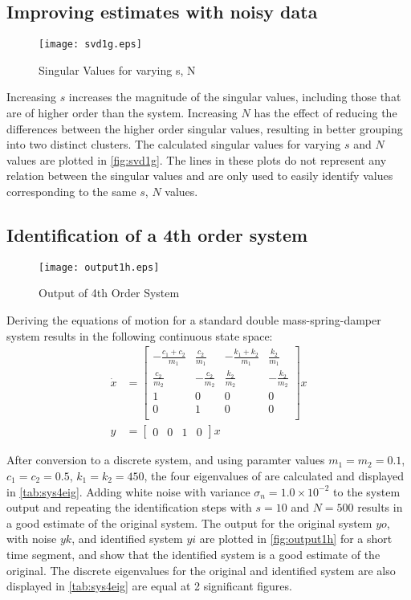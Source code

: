 \documentclass[11pt,a4paper]{article}
\begin{document}
\subsection{Improving estimates with noisy data}
\begin{figure}
    \centering
    \texttt{[image: svd1g.eps]}
    \caption{Singular Values for varying s, N}
    \label{fig:svd1g}
\end{figure}
Increasing $s$ increases the magnitude of the singular values, including those
that are of higher order than the system. Increasing $N$ has the effect of
reducing the differences between the higher order singular values, resulting in
better grouping into two distinct clusters. The calculated singular values for
varying $s$ and $N$ values are plotted in \autoref{fig:svd1g}. The lines in
these plots do not represent any relation between the singular values and are
only used to easily identify values corresponding to the same $s$, $N$ values.

\subsection{Identification of a 4th order system}
\begin{figure}
    \centering
    \texttt{[image: output1h.eps]}
    \caption{Output of 4th Order System}
    \label{fig:output1h}
\end{figure}
Deriving the equations of motion for a standard double mass-spring-damper
system results in the following continuous state space:
\begin{align}
    \dot{x} &=
        \begin{bmatrix}
            -\frac{c_1+c_2}{m_1} & \frac{c_2}{m_1} &
                -\frac{k_1+k_2}{m_1} & \frac{k_2}{m_1} \\
            \frac{c_2}{m_2} & -\frac{c_2}{m_2} &
                \frac{k_2}{m_2} & -\frac{k_2}{m_2} \\
            1 & 0 & 0 & 0 \\
            0 & 1 & 0 & 0 \\
        \end{bmatrix} x  \\
    y &= \begin{bmatrix} 0 & 0 & 1 & 0 \end{bmatrix} x
\end{align}

After conversion to a discrete system, and using paramter values
\mbox{$ m_1 = m_2 = 0.1 $}, \mbox{$ c_1 = c_2 = 0.5 $},
\mbox{$ k_1 = k_2 = 450 $}, the four eigenvalues of
are calculated and displayed in \autoref{tab:sys4eig}. Adding white noise with
variance $\sigma_n = 1.0 \times 10^{-2}$ to the system output and repeating the
identification steps with $s = 10$ and $N = 500$ results in a good estimate of
the original system. The output for the original system $yo$, with noise $yk$,
and identified system $yi$ are plotted in \autoref{fig:output1h} for a short
time segment, and show that the identified system is a good estimate of the
original. The discrete eigenvalues for the original and identified system are
also displayed in \autoref{tab:sys4eig} are equal at 2 significant figures.
\end{document}
